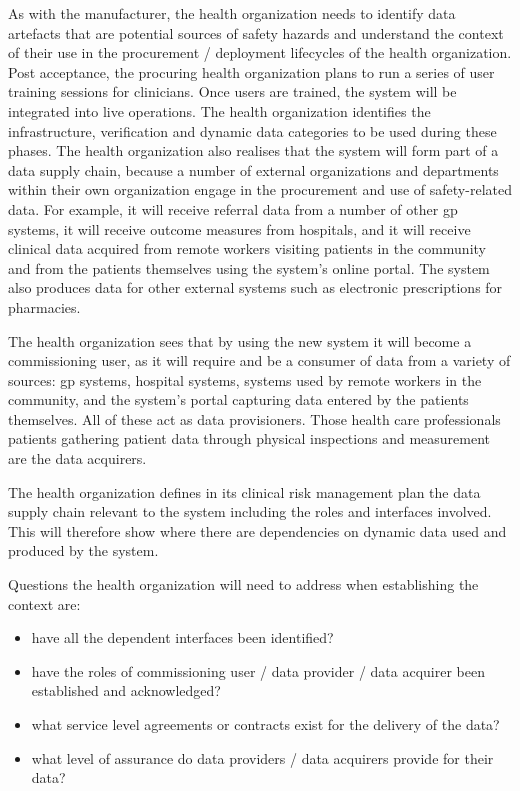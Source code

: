 As with the manufacturer, the health organization needs to identify \glspl{data artefact} that are potential sources of safety hazards and understand the context of their use in the procurement / deployment lifecycles of the health organization.
Post acceptance, the procuring health organization plans to run a series of user training sessions for clinicians.
Once users are trained, the system will be integrated into live operations.
The health organization identifies the infrastructure,
\gls{verification} and dynamic data categories to be used
during these phases.
The health organization also realises that the system will form part of a data supply chain, because a number of external organizations and departments within their own organization engage in the procurement and use of safety-related data.
For example, it will receive referral data from a number of other \gls{gp} systems, it will receive outcome measures from hospitals, and it will receive clinical data acquired from remote workers visiting patients in the community and from the patients themselves using the system's online portal.
The system also produces data for other external systems such as electronic prescriptions for pharmacies.

The health organization sees that by using the new system it will become a commissioning user, as it will require and be a consumer of data from a variety of sources: \gls{gp} systems, hospital systems, systems used by remote workers in the community, and the system's portal capturing data entered by the patients themselves. All of these act as data provisioners. Those health care professionals patients gathering patient data through physical inspections and measurement are the data acquirers.

The health organization defines in its clinical risk management plan the data supply chain relevant to the system including the roles and interfaces involved. This will therefore show where there are dependencies on dynamic data used and produced by the system.

Questions the health organization will need to address when establishing the context are:
\begin{itemize}
  \item have all the dependent interfaces been identified?
  \item have the roles of commissioning user / data provider / data acquirer been established and acknowledged?
  \item what service level agreements or contracts exist for the delivery of the data?
  \item what level of assurance do data providers / data acquirers provide for their data?
\end{itemize}


